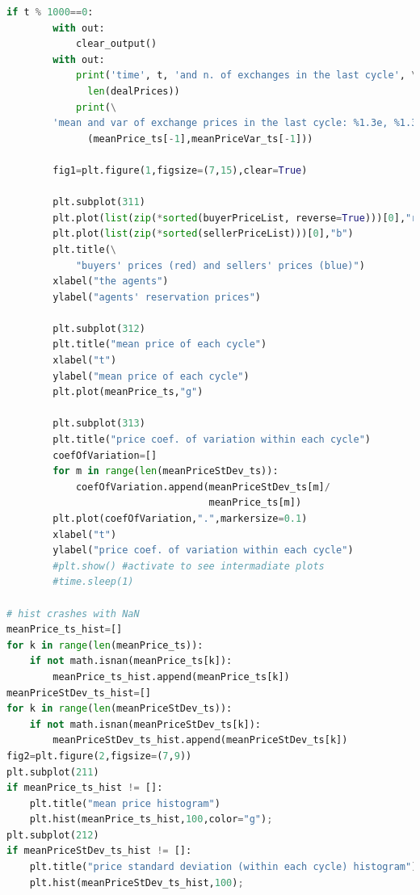 \documentclass[10pt]{report}
\begin{document}
\begin{appendices}
\begin{lstlisting}[language=Python, caption=The model in the corrupted simplified hayekian perspective, 
label={The listing of model in the corrupted simplified hayekian perspective},basicstyle=\ttfamily\footnotesize]
    if t % 1000==0:
        with out:
            clear_output()
        with out:
            print('time', t, 'and n. of exchanges in the last cycle', \
              len(dealPrices))
            print(\
        'mean and var of exchange prices in the last cycle: %1.3e, %1.3e' %\
              (meanPrice_ts[-1],meanPriceVar_ts[-1]))

        fig1=plt.figure(1,figsize=(7,15),clear=True)

        plt.subplot(311)
        plt.plot(list(zip(*sorted(buyerPriceList, reverse=True)))[0],"r")
        plt.plot(list(zip(*sorted(sellerPriceList)))[0],"b")
        plt.title(\
            "buyers' prices (red) and sellers' prices (blue)")
        xlabel("the agents")
        ylabel("agents' reservation prices")

        plt.subplot(312)
        plt.title("mean price of each cycle")
        xlabel("t")
        ylabel("mean price of each cycle")
        plt.plot(meanPrice_ts,"g")
        
        plt.subplot(313)
        plt.title("price coef. of variation within each cycle")
        coefOfVariation=[]
        for m in range(len(meanPriceStDev_ts)):
            coefOfVariation.append(meanPriceStDev_ts[m]/
                                   meanPrice_ts[m])
        plt.plot(coefOfVariation,".",markersize=0.1)
        xlabel("t")
        ylabel("price coef. of variation within each cycle")
        #plt.show() #activate to see intermadiate plots
        #time.sleep(1)
        
# hist crashes with NaN
meanPrice_ts_hist=[]
for k in range(len(meanPrice_ts)): 
    if not math.isnan(meanPrice_ts[k]):
        meanPrice_ts_hist.append(meanPrice_ts[k])
meanPriceStDev_ts_hist=[]
for k in range(len(meanPriceStDev_ts)): 
    if not math.isnan(meanPriceStDev_ts[k]):
        meanPriceStDev_ts_hist.append(meanPriceStDev_ts[k])
fig2=plt.figure(2,figsize=(7,9))
plt.subplot(211)
if meanPrice_ts_hist != []:
    plt.title("mean price histogram")
    plt.hist(meanPrice_ts_hist,100,color="g");
plt.subplot(212)
if meanPriceStDev_ts_hist != []:
    plt.title("price standard deviation (within each cycle) histogram")
    plt.hist(meanPriceStDev_ts_hist,100);
\end{lstlisting}








\end{appendices}
\end{document}
